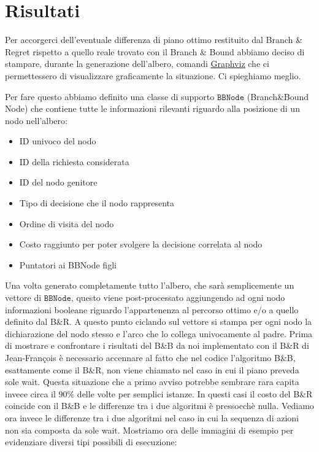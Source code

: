 \documentclass[
    article,            %
    12pt,                %
    oneside,            %
    a4paper,            %
    english,            %
    italian,                %
    sumario=tradicional,
]{abntex2}
\begin{document}
\section{Risultati}
Per accorgerci dell'eventuale differenza di piano ottimo restituito dal Branch \& Regret rispetto a quello reale trovato con il Branch \& Bound abbiamo deciso di stampare, durante la generazione dell'albero, comandi \href{https://graphviz.org/}{Graphviz} che ci permettessero di visualizzare graficamente la situazione. Ci spieghiamo meglio. 

Per fare questo abbiamo definito una classe di supporto $\texttt{BBNode}$ (Branch\&Bound Node) che contiene tutte le informazioni rilevanti riguardo alla posizione di un nodo nell'albero: 
\begin{itemize}
    \item ID univoco del nodo
    \item ID della richiesta considerata
    \item ID del nodo genitore
    \item Tipo di decisione che il nodo rappresenta
    \item Ordine di visita del nodo
    \item Costo raggiunto per poter svolgere la decisione correlata al nodo
    \item Puntatori ai BBNode figli
\end{itemize}
Una volta generato completamente tutto l'albero, che sarà semplicemente un vettore di $\texttt{BBNode}$, questo viene post-processato aggiungendo ad ogni nodo informazioni booleane riguardo l'appartenenza al percorso ottimo e/o a quello definito dal B\&R. A questo punto ciclando sul vettore si stampa per ogni nodo la dichiarazione del nodo stesso e l'arco che lo collega univocamente al padre. 
\newline
Prima di mostrare e confrontare i risultati del B\&B da noi implementato con il B\&R di Jean-François è necessario accennare al fatto che nel codice l'algoritmo B\&B, esattamente come il B\&R, non viene chiamato nel caso in cui il piano preveda sole wait. Questa situazione che a primo avviso potrebbe sembrare rara capita invece circa il $90\%$ delle volte per semplici istanze. In questi casi il costo del B\&R coincide con il B\&B e le differenze tra i due algoritmi è pressocchè nulla. Vediamo ora invece le differenze tra i due algoritmi nel caso in cui la sequenza di azioni non sia composta da sole wait. Mostriamo ora delle immagini di esempio per evidenziare diversi tipi possibili di esecuzione:
\end{document}
